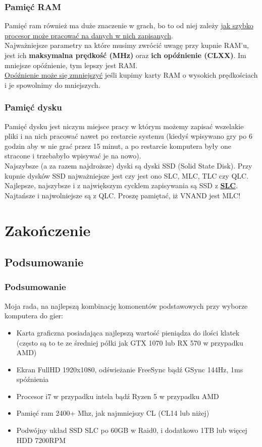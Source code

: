 \documentclass{beamer}
\begin{document}

\begin{frame}
\frametitle{Pamięć RAM}
    Pamięć ram również ma duże znaczenie w grach, bo to od niej zależy \underline{jak szybko procesor może pracować na danych w nich zapisanych}.\\
    Najważniejsze parametry na które musimy zwrócić uwagę przy kupnie RAM'u, jest ich \textbf{maksymalna prędkość (MHz)} oraz \textbf{ich opóźnienie (CLXX)}. Im mniejsze opóźnienie, tym lepszy jest RAM.\\
    \underline{Opóźnienie może się zmniejszyć} jeśli kupimy karty RAM o wysokich prędkościach i je spowolnimy do mniejszych.
\end{frame}


\begin{frame}
\frametitle{Pamięć dysku}
    Pamięć dysku jest niczym miejsce pracy w którym możemy zapisać wszelakie pliki i na nich pracować nawet po restarcie systemu (kiedyś wpisywano gry po 6 godzin aby w nie grać przez 15 minut, a po restarcie komputera były one stracone i trzebabyło wpisywać je na nowo).\\
    Najszybsze (a za razem najdroższe) dyski są dyski SSD (Solid State Disk). Przy kupnie dysków SSD najważniejsze jest czy jest ono SLC, MLC, TLC czy QLC. Najlepsze, najszybsze i z największym cycklem zapisywania są SSD z \underline{\textbf{SLC}}. Najtańsze i najwolniejsze są z QLC. Proszę pamiętać, iż VNAND jest MLC!
\end{frame}


\section{Zakończenie}
\subsection{Podsumowanie}

\begin{frame}
\frametitle{Podsumowanie}
    Moja rada, na najlepszą kombinację komonentów podstawowych przy wyborze komputera do gier:
    \begin{itemize}
        \item Karta graficzna posiadająca najlepszą wartość pieniądza do ilości klatek (często są to te ze średniej półki jak GTX 1070 lub RX 570 w przypadku AMD)
        \item Ekran FullHD 1920x1080, odświeżanie FreeSync bądź GSync 144Hz, 1ms spóźnienia
        \item Procesor i7 w przypadku intela bądź Ryzen 5 w przypadku AMD
        \item Pamięć ram 2400+ Mhz, jak najmniejszy CL (CL14 lub niżej)
        \item Podwójny układ SSD SLC po 60GB w Raid0, i dodatkowo 1TB lub więcej HDD 7200RPM
    \end{itemize}
\end{frame}
\end{document}
